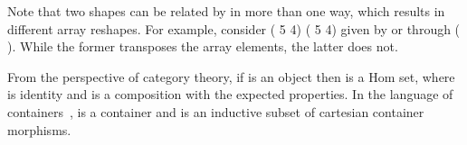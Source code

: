 Note that two shapes can be related by  in more than
one way, which results in different array reshapes.  
For example, consider  ( 5   4) ( 5   4)
given by  or through (  ).  While the former transposes 
the array elements, the latter does not.
From the perspective of category theory, if  is an object then 
is a Hom set, where  is identity and  is a composition with
the expected properties.  In the language of containers~\cite{containers},  is
a container and  is an inductive subset of cartesian container morphisms.



